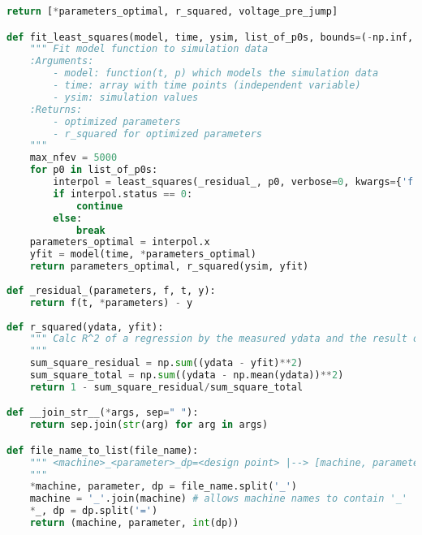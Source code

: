 \begin{lstlisting}[language=python, caption=Auszug aus \texttt{modelicaSweep.py}, label=lst:ModelicaSweep]
    return [*parameters_optimal, r_squared, voltage_pre_jump]

def fit_least_squares(model, time, ysim, list_of_p0s, bounds=(-np.inf, np.inf)):
    """ Fit model function to simulation data
    :Arguments: 
        - model: function(t, p) which models the simulation data
        - time: array with time points (independent variable)
        - ysim: simulation values
    :Returns:
        - optimized parameters
        - r_squared for optimized parameters
    """
    max_nfev = 5000
    for p0 in list_of_p0s:
        interpol = least_squares(_residual_, p0, verbose=0, kwargs={'f':model, 'y':ysim, 't':time}, max_nfev=max_nfev, bounds=bounds)
        if interpol.status == 0:
            continue
        else:
            break
    parameters_optimal = interpol.x
    yfit = model(time, *parameters_optimal)
    return parameters_optimal, r_squared(ysim, yfit)
    
def _residual_(parameters, f, t, y):
    return f(t, *parameters) - y
    
def r_squared(ydata, yfit):
    """ Calc R^2 of a regression by the measured ydata and the result of the curve fitting yfit
    """
    sum_square_residual = np.sum((ydata - yfit)**2)
    sum_square_total = np.sum((ydata - np.mean(ydata))**2)
    return 1 - sum_square_residual/sum_square_total

def __join_str__(*args, sep=" "):
    return sep.join(str(arg) for arg in args)

def file_name_to_list(file_name):
    """ <machine>_<parameter>_dp=<design point> |--> [machine, parameter, design point]
    """
    *machine, parameter, dp = file_name.split('_')
    machine = '_'.join(machine) # allows machine names to contain '_'
    *_, dp = dp.split('=')
    return (machine, parameter, int(dp))
\end{lstlisting}

